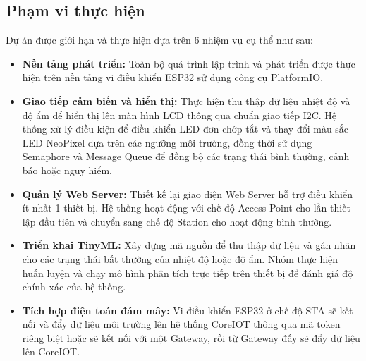 \subsection{Phạm vi thực hiện}
Dự án được giới hạn và thực hiện dựa trên 6 nhiệm vụ cụ thể như sau:
\begin{itemize}
    \item \textbf{Nền tảng phát triển:} Toàn bộ quá trình lập trình và phát triển được thực hiện trên nền tảng vi điều khiển ESP32 sử dụng công cụ PlatformIO.
    \item \textbf{Giao tiếp cảm biến và hiển thị:} Thực hiện thu thập dữ liệu nhiệt độ và độ ẩm để hiển thị lên màn hình LCD thông qua chuẩn giao tiếp I2C. Hệ thống xử lý điều kiện để điều khiển LED đơn chớp tắt và thay đổi màu sắc LED NeoPixel dựa trên các ngưỡng môi trường, đồng thời sử dụng Semaphore và Message Queue để đồng bộ các trạng thái bình thường, cảnh báo hoặc nguy hiểm.
    \item \textbf{Quản lý Web Server:} Thiết kế lại giao diện Web Server hỗ trợ điều khiển ít nhất 1 thiết bị. Hệ thống hoạt động với chế độ Access Point cho lần thiết lập đầu tiên và chuyển sang chế độ Station cho hoạt động bình thường.
    \item \textbf{Triển khai TinyML:} Xây dựng mã nguồn để thu thập dữ liệu và gán nhãn cho các trạng thái bất thường của nhiệt độ hoặc độ ẩm. Nhóm thực hiện huấn luyện và chạy mô hình phân tích trực tiếp trên thiết bị để đánh giá độ chính xác của hệ thống.
    \item \textbf{Tích hợp điện toán đám mây:} Vi điều khiển ESP32 ở chế độ STA sẽ kết nối và đẩy dữ liệu môi trường lên hệ thống CoreIOT thông qua mã token riêng biệt hoặc sẽ kết nối với một Gateway, rồi từ Gateway đấy sẽ đẩy dữ liệu lên CoreIOT.
\end{itemize}